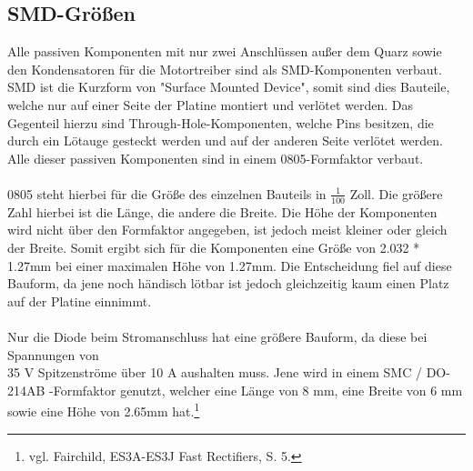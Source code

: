 \documentclass[12pt]{article}
\begin{document}
\subsection{SMD-Größen}
Alle passiven Komponenten mit nur zwei Anschlüssen außer dem Quarz sowie den Kondensatoren für die Motortreiber sind als SMD-Komponenten verbaut. SMD ist die Kurzform von "Surface Mounted Device", somit sind dies Bauteile, welche nur auf einer Seite der Platine montiert und verlötet werden. Das Gegenteil hierzu sind Through-Hole-Komponenten, welche Pins besitzen, die durch ein Lötauge gesteckt werden und auf der anderen Seite verlötet werden. Alle dieser passiven Komponenten sind in einem 0805-Formfaktor verbaut.\\\\
0805 steht hierbei für die Größe des einzelnen Bauteils in $\frac{1}{100}$ Zoll. Die größere Zahl hierbei ist die Länge, die andere die Breite. Die Höhe der Komponenten wird nicht über den Formfaktor angegeben, ist jedoch meist kleiner oder gleich der Breite. Somit ergibt sich für die Komponenten eine Größe von 2.032 * 1.27mm bei einer maximalen Höhe von 1.27mm. Die Entscheidung fiel auf diese Bauform, da jene noch händisch lötbar ist jedoch gleichzeitig kaum einen Platz auf der Platine einnimmt. 
\\\\Nur die Diode beim Stromanschluss hat eine größere Bauform, da diese bei Spannungen von\\35 V Spitzenströme über 10 A aushalten muss. Jene wird in einem SMC / DO-214AB -Formfaktor genutzt, welcher eine Länge von 8 mm, eine Breite von 6 mm sowie eine Höhe von 2.65mm hat.\footnote{\selectfont vgl. Fairchild, ES3A-ES3J Fast Rectifiers, S. 5.}
\end{document}
